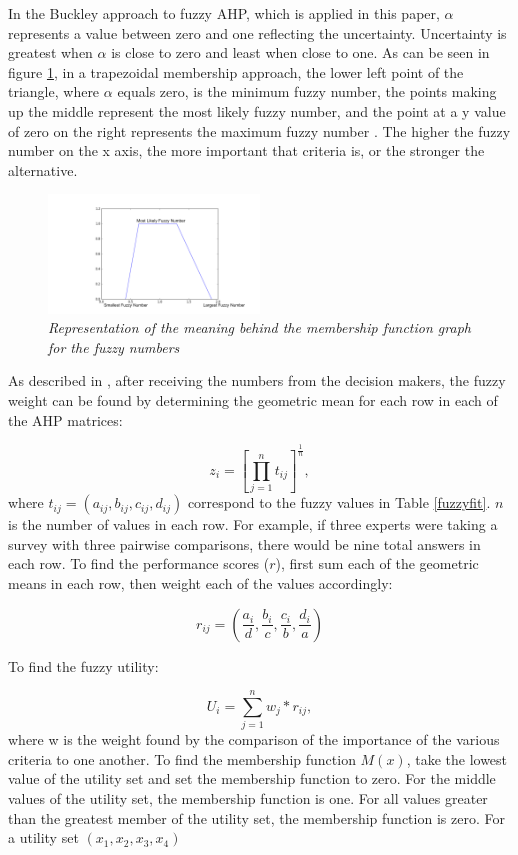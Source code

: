  In the Buckley approach to fuzzy AHP, which is applied in this paper, $\alpha$ represents a value between zero and one reflecting the uncertainty.  Uncertainty is greatest when $\alpha$ is close to zero and least when close to one. As can be seen in figure \ref{fuzzy_exp}, in a trapezoidal membership approach, the lower left point of the triangle, where $\alpha$ equals zero, is the minimum fuzzy number, the points making up the middle represent the most likely fuzzy number, and the point at a y value of zero on the right represents the maximum fuzzy number \cite{Pan2008}. The higher the fuzzy number on the x axis, the more important that criteria is, or the stronger the alternative.
\begin{figure}[h!]
  \centering
  \includegraphics[width=0.5\textwidth]{fuzzy_explaination.png}
   \caption{\small \sl Representation of the meaning behind the membership function graph for the fuzzy numbers}
   \label{fuzzy_exp}
\end{figure}

 As described in \cite{Kahraman2010}, after receiving the numbers from the decision makers, the fuzzy weight can be found by determining the geometric mean for each row in each of the AHP matrices:

 \begin{equation}
 z_i=[\prod_{j=1}^n t_{ij}]^{\frac{1}{n}},
 \end{equation} where $t_{ij}=(a_{ij},b_{ij}, c_{ij}, d_{ij})$ correspond to the fuzzy values in Table \ref{fuzzyfit}. $n$ is the number of values in each row.  For example, if three experts were taking a survey with three pairwise comparisons, there would be nine total answers in each row. To find the performance scores ($r$), first sum each of the geometric means in each row, then weight each of the values accordingly:

\begin{equation}
r_{ij}=(\frac{a_i}{d},\frac{b_i}{c},\frac{c_i}{b},\frac{d_i}{a})
\end{equation}

To find the fuzzy utility:

\begin{equation}
U_i=\sum_{j=1}^n w_j*r_{ij},
\end{equation} where w is the weight found by the comparison of the importance of the various criteria to one another. To find the membership function $M(x)$, take the lowest value of the utility set and set the membership function to zero.  For the middle values of the utility set, the membership function is one. For all values greater than the greatest member of the utility set, the membership function is zero. For a utility set $(x_1,x_2,x_3,x_4)$

